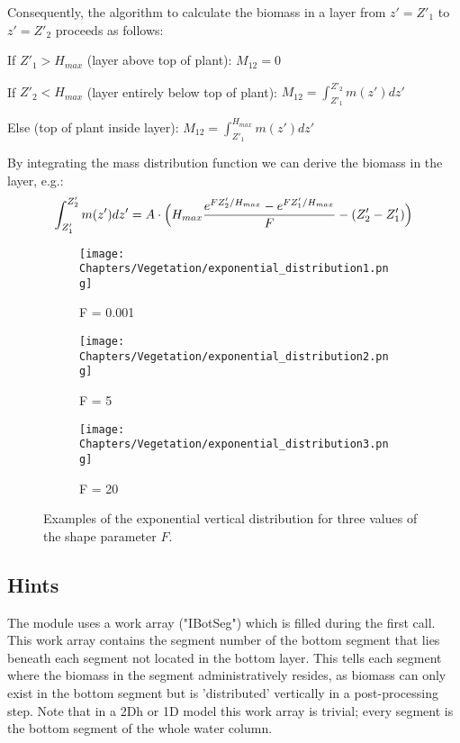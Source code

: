 Consequently, the algorithm to calculate the biomass in a layer from $z' = Z'_1$ to $z' = Z'_2$ proceeds as follows:

If $Z'_1 > H_{max}$ (layer above top of plant): $M_{12} = 0$

If $Z'_2 < H_{max}$ (layer entirely below top of plant): $M_{12} = \int_{Z'_1}^{Z'_2} m(z')dz'$

Else (top of plant inside layer): $M_{12} = \int_{Z'_1}^{H_{max}} m(z')dz'$


By integrating the mass distribution function we can derive the biomass in the layer, e.g.:
%
\begin{equation}
\int_{Z'_1}^{Z'_2} m(z')dz' = A \cdot \Bigl( H_{max} \frac{e^{FZ'_2/H_{max}} - e^{FZ'_1/H_{max}}}{F} - (Z'_2 - Z'_1) \Bigr)
\end{equation}

\begin{figure}
\begin{subfigure}{0.3\textwidth}
\texttt{[image: Chapters/Vegetation/exponential\_distribution1.png]}
\caption{F = 0.001}
\label{fig:verticalDistributionExp1}
\end{subfigure}
\hfill
\begin{subfigure}{0.3\textwidth}
\texttt{[image: Chapters/Vegetation/exponential\_distribution2.png]}
\caption{F = 5}
\label{fig:verticalDistributionExp2}
\end{subfigure}
\hfill
\begin{subfigure}{0.3\textwidth}
\texttt{[image: Chapters/Vegetation/exponential\_distribution3.png]}
\caption{F = 20}
\label{fig:verticalDistributionExp3}
\end{subfigure}
\caption{Examples of the exponential vertical distribution for three values of the shape parameter $F$.}
\label{fig:verticalDistributionExp}
\end{figure}

\subsection{Hints}

The module uses a work array ("IBotSeg") which is filled during the first call.
This work array contains the segment number of the bottom segment that lies beneath each segment not
located in the bottom layer. This tells each segment where the biomass in the segment administratively
resides, as biomass can only exist in the bottom segment but is 'distributed' vertically in a post-processing step.
Note that in a 2Dh or 1D model this work array is trivial; every segment is the bottom segment of the whole water column.

